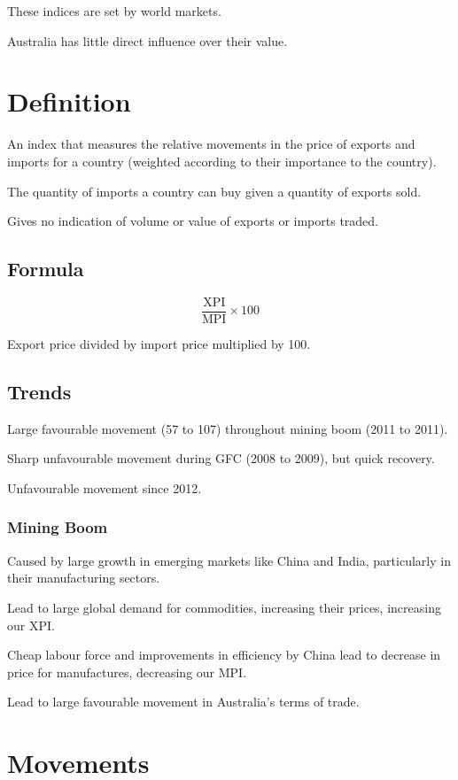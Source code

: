 \documentclass[a4paper,11pt]{report}
\begin{document}
These indices are set by world markets.

Australia has little direct influence over their value.


\section{Definition}

An index that measures the relative movements in the price of exports and
imports for a country (weighted according to their importance to the country).

The quantity of imports a country can buy given a quantity of exports sold.

Gives no indication of volume or value of exports or imports traded.

\subsection{Formula}

$$
\frac{\text{XPI}}{\text{MPI}} \times 100
$$

Export price divided by import price multiplied by 100.

\subsection{Trends}

Large favourable movement (57 to 107) throughout mining boom (2011 to 2011).

Sharp unfavourable movement during GFC (2008 to 2009), but quick recovery.

Unfavourable movement since 2012.

\subsubsection{Mining Boom}

Caused by large growth in emerging markets like China and India, particularly
in their manufacturing sectors.

Lead to large global demand for commodities, increasing their prices,
increasing our XPI.

Cheap labour force and improvements in efficiency by China lead to decrease in
price for manufactures, decreasing our MPI.

Lead to large favourable movement in Australia's terms of trade.


\section{Movements}
\end{document}
